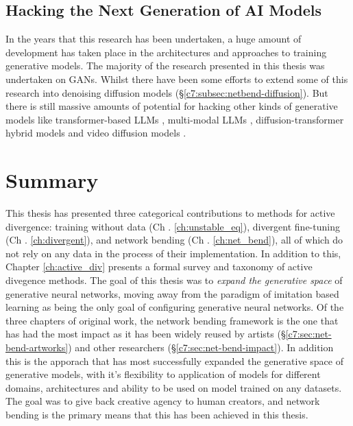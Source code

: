 \subsection{Hacking the Next Generation of AI Models}

In the years that this research has been undertaken, a huge amount of development has taken place in the architectures and approaches to training generative models.
The majority of the research presented in this thesis was undertaken on GANs.
Whilst there have been some efforts to extend some of this research into denoising diffusion models \citep{dzwonczyk2024network} (\S \ref{c7:subsec:netbend-diffusion}). 
But there is still massive amounts of potential for hacking other kinds of generative models like transformer-based LLMs \citep{vaswani2017attention}, multi-modal LLMs \citep{zhang2024mm}, diffusion-transformer hybrid models \citep{peebles2023scalable} and video diffusion models \citep{ho2022video}.

\section{Summary}

This thesis has presented three categorical contributions to methods for active divergence: training without data (Ch . \ref{ch:unstable_eq}), divergent fine-tuning  (Ch . \ref{ch:divergent}), and network bending  (Ch . \ref{ch:net_bend}), all of which do not rely on any data in the process of their implementation. 
In addition to this, Chapter \ref{ch:active_div} presents a formal survey and taxonomy of active divegence methods.
The goal of this thesis was to \textit{expand the generative space} of generative neural networks, moving away from the paradigm of imitation based learning as being the only goal of configuring generative neural networks.
Of the three chapters of original work, the network bending framework is the one that has had the most impact as it has been widely reused by artists  (\S \ref{c7:sec:net-bend-artworks}) and other researchers  (\S \ref{c7:sec:net-bend-impact}). 
In addition this is the apporach that has most successfully expanded the generative space of generative models, with it's flexibility to application of models for different domains, architectures and ability to be used on model trained on any datasets.
The goal was to give back creative agency to human creators, and network bending is the primary means that this has been achieved in this thesis.